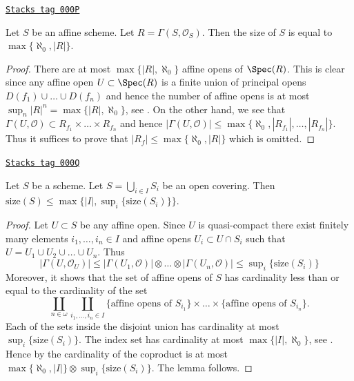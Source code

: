 \begin{lemma}
\label{sets-lemma-bound-affine}
\href{https://stacks.math.columbia.edu/tag/000P}{\texttt{Stacks tag 000P}}

Let $S$ be an affine scheme.
Let $R = \Gamma(S, \mathcal{O}_S)$.
Then the size of $S$ is equal to $\max\{ \aleph_0, |R|\}$.
\end{lemma}

\begin{proof}
There are at most $\max\{|R|, \aleph_0\}$ affine opens of
$\Spec(R)$. This is clear since any affine open
$U \subset \Spec(R)$ is a finite union of principal
opens $D(f_1) \cup \ldots \cup D(f_n)$ and hence the number
of affine opens is at most $\sup_n |R|^n = \max\{|R|, \aleph_0\}$,
see \cite[Ch. I, 10.13]{Kunen}. On the other hand, we see that
$\Gamma(U, \mathcal{O}) \subset R_{f_1} \times \ldots \times R_{f_n}$
and hence $|\Gamma(U, \mathcal{O})| \leq
\max\{\aleph_0, |R_{f_1}|, \ldots, |R_{f_n}|\}$. Thus
it suffices to prove that $|R_f| \leq \max\{\aleph_0, |R|\}$
which is omitted.
\end{proof}

\begin{lemma}
\label{sets-lemma-bound-size}
\href{https://stacks.math.columbia.edu/tag/000Q}{\texttt{Stacks tag 000Q}}

Let $S$ be a scheme. Let $S = \bigcup_{i \in I} S_i$ be
an open covering. Then
$\text{size}(S) \leq \max\{|I|, \sup_i\{\text{size}(S_i)\}\}$.
\end{lemma}

\begin{proof}
Let $U \subset S$ be any affine open. Since $U$ is quasi-compact
there exist finitely many elements $i_1, \ldots, i_n \in I$
and affine opens $U_i \subset U \cap S_i$ such that
$U = U_1 \cup U_2 \cup \ldots \cup U_n$. Thus
$$
|\Gamma(U, \mathcal{O}_U)|
\leq
|\Gamma(U_1, \mathcal{O})|
\otimes
\ldots
\otimes
|\Gamma(U_n, \mathcal{O})|
\leq \sup\nolimits_i\{\text{size}(S_i)\}
$$
Moreover, it shows that the set of affine opens of $S$ has
cardinality less than or equal to the cardinality of the set
$$
\coprod_{n \in \omega}
\coprod_{i_1, \ldots, i_n \in I}
\{\text{affine opens of }S_{i_1}\}
\times
\ldots
\times
\{\text{affine opens of }S_{i_n}\}.
$$
Each of the sets inside the disjoint union has cardinality at most
$\sup_i\{\text{size}(S_i)\}$. The index set has cardinality at most
$\max\{|I|, \aleph_0\}$, see \cite[Ch. I, 10.13]{Kunen}.
Hence by \cite[Lemma 5.8]{Jech} the cardinality
of the coproduct is at most $\max\{\aleph_0, |I|\}
\otimes \sup_i\{\text{size}(S_i)\}$. The lemma follows.
\end{proof}

